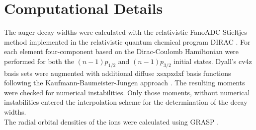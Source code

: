 \section{Computational Details}
\label{section:computational}
The auger decay widths were calculated with the relativistic FanoADC-Stieltjes
method
implemented in the relativistic quantum chemical program DIRAC \cite{DIRAC17}.
For each element four-component based on the Dirac-Coulomb Hamiltonian were
performed for both the $(n-1)p_{1/2}$ and $(n-1)p_{3/2}$ initial states.
Dyall's cv4z basis sets \cite{} were augmented with additional diffuse
xsxpxdxf
basis functions following the Kaufmann-Baumeister-Jungen approach
\cite{Kaufmann89}.
The resulting moments were checked for numerical instabilities.
Only those moments, without numerical instabilities entered the interpolation
scheme for the determination of the decay widths.\\
The radial orbital densities of the ions were calculated using GRASP
\cite{Parpia96,xyz}.
